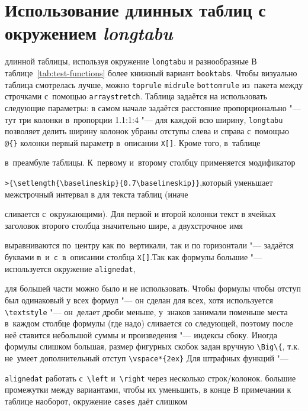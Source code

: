 \section{Использование длинных таблиц с окружением \textit{longtabu}}\label{app:B2a}
длинной таблицы, используя окружение \verb!longtabu! и разнообразные
В таблице~\ref{tab:test-functions} более книжный вариант
\verb!booktabs!. Чтобы визуально таблица смотрелась лучше, можно
\verb!toprule! \verb!midrule! \verb!bottomrule! из~пакета
между строчками с~помощью \verb!arraystretch!. Таблица задаётся на
использовать следующие параметры: в самом начале задаётся расстояние
пропорционально "--- тут три колонки в~пропорции 1.1:1:4 "--- для каждой
всю ширину, \verb!longtabu! позволяет делить ширину колонок
убраны отступы слева и справа с~помощью \verb!@{}!
колонки первый параметр в~описании \verb!X[]!. Кроме того, в~таблице

в~преамбуле таблицы. К~первому и~второму столбцу применяется
модификатор

\verb!>{\setlength{\baselineskip}{0.7\baselineskip}}!,\noindent который уменьшает межстрочный интервал в для текста таблиц (иначе

сливается с~окружающими). Для первой и второй колонки текст в ячейках
заголовок второго столбца значительно шире, а двухстрочное имя

выравниваются по~центру как по~вертикали, так и по горизонтали "---
задаётся буквами \verb!m!~и~\verb!c!~в~описании столбца \verb!X[]!.Так как формулы большие "--- используется окружение \verb!alignedat!,

для большей части можно было и не использовать.  Чтобы формулы
чтобы отступ был одинаковый у всех формул "--- он сделан для всех, хотя
используется \verb!\textstyle! "--- он~делает дроби меньше, у~знаков
занимали поменьше места в~каждом столбце формулы (где надо)
сливается со следующей, поэтому после неё ставится небольшой
суммы и произведения "--- индексы сбоку. Иногда формулы слишком большая,
размер фигурных скобок задан вручную \verb!\Big\{!, т.\:к. не~умеет
дополнительный отступ \verb!\vspace*{2ex}!  Для штрафных функций "---

\verb!alignedat! работать с~\verb!\left! и~\verb!\right! через
несколько строк/колонок.
большие промежутки между вариантами, чтобы их уменьшить, в конце
В примечании к таблице наоборот, окружение \verb!cases! даёт слишком

